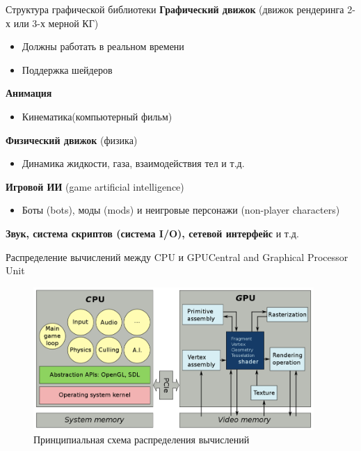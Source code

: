 \documentclass{beamer}
\begin{document}
\begin{frame}{Структура графической библиотеки}
	\textbf{Графический движок} (движок рендеринга 2-х или 3-х мерной КГ)
	
	
	\begin{itemize}
		\item 
		Должны работать в реальном времени
		\item 
		Поддержка шейдеров
	\end{itemize}
	
	\textbf{Анимация}
	\begin{itemize}
		\item 
		Кинематика(компьютерный фильм)
	\end{itemize}
	
	\textbf{Физический движок }(физика)
	\begin{itemize}
		\item 
		Динамика жидкости, газа, взаимодействия тел и т.д.
	\end{itemize}

	\textbf{Игровой ИИ} (game artificial intelligence)
	\begin{itemize}
		\item 
		Боты (bots), моды (mods) и неигровые персонажи (non-player characters)
	\end{itemize}
	
	\textbf{Звук, система скриптов (система I/O), сетевой интерфейс} и т.д.
\end{frame}

\begin{frame}{Распределение вычислений между CPU и GPU}{Central and Graphical Processor Unit}
	\begin{figure} 
		\includegraphics[width=0.95\textwidth]{images/Calculation_distribution_scheme.png}
		\caption {Принципиальная схема распределения вычислений}
	\end{figure}
\end{frame}
\end{document}
